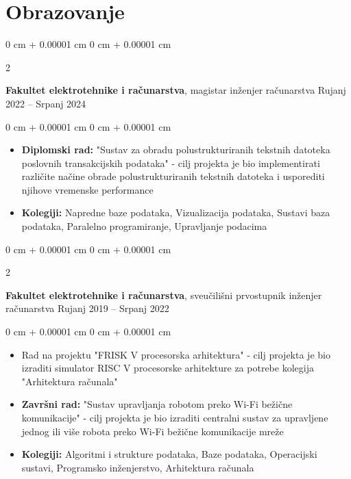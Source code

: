 \documentclass[10pt, letterpaper]{article}
\newenvironment{highlights}{
    \begin{itemize}[
        topsep=0.10 cm,
        parsep=0.10 cm,
        partopsep=0pt,
        itemsep=0pt,
        leftmargin=0 cm + 10pt
    ]
}{
    \end{itemize}
} %
\newenvironment{onecolentry}{
    \begin{adjustwidth}{
        0 cm + 0.00001 cm
    }{
        0 cm + 0.00001 cm
    }
}{
    \end{adjustwidth}
} %
\newenvironment{twocolentry}[2][]{
    \onecolentry
    \def\secondColumn{#2}
    \setcolumnwidth{\fill, 4.5 cm}
    \begin{paracol}{2}
}{
    \switchcolumn \raggedleft \secondColumn
    \end{paracol}
    \endonecolentry
} %
\begin{document}
    \section{Obrazovanje}



        \begin{twocolentry}{
            Rujanj 2022 – Srpanj 2024
        }
            \textbf{Fakultet elektrotehnike i računarstva}, magistar inženjer računarstva\end{twocolentry}

        \vspace{0.10 cm}
        \begin{onecolentry}
            \begin{highlights}
                \item \textbf{Diplomski rad:} "Sustav za obradu polustrukturiranih tekstnih datoteka poslovnih transakcijskih podataka" - cilj projekta je bio implementirati različite načine obrade polustrukturiranih tekstnih datoteka i usporediti njihove vremenske performance
                \item \textbf{Kolegiji:} Napredne baze podataka, Vizualizacija podataka, Sustavi baza podataka, Paralelno programiranje, Upravljanje podacima
            \end{highlights}
        \end{onecolentry}    


        \begin{twocolentry}{
            Rujanj 2019 – Srpanj 2022
        }
            \textbf{Fakultet elektrotehnike i računarstva}, sveučilišni prvostupnik inženjer računarstva\end{twocolentry}

        \vspace{0.10 cm}
        \begin{onecolentry}
            \begin{highlights}
                \item Rad na projektu "FRISK V procesorska arhitektura" - cilj projekta je bio izraditi simulator RISC V procesorske arhitekture za potrebe kolegija "Arhitektura računala"
                \item \textbf{Završni rad:} "Sustav upravljanja robotom preko Wi-Fi bežične komunikacije" - cilj projekta je bio izraditi centralni sustav za upravljene jednog ili više robota preko Wi-Fi bežične komunikacije mreže
                \item \textbf{Kolegiji:} Algoritmi i strukture podataka, Baze podataka, Operacijski sustavi, Programsko inženjerstvo, Arhitektura računala
            \end{highlights}
        \end{onecolentry}
\end{document}
